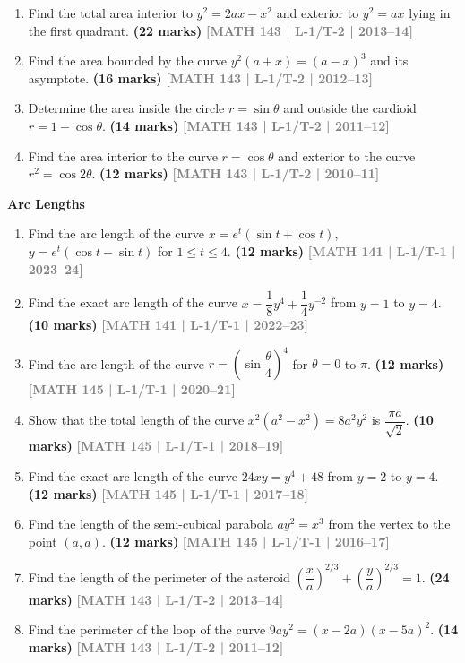 \documentclass[12pt,a4paper]{article}
\newcommand{\yr}[1]{\hfill\textcolor{gray}{\small\textbf{[#1]}}}
\newcommand{\mk}[1]{\textcolor{orange!70!black}{\small\textbf{(#1 marks)}}}
\newcommand{\subtopic}[2]{%
  \vspace{10pt}
  \noindent\begin{tcolorbox}[colback=#1!8,colframe=#1,boxrule=0.6pt,arc=4pt,
    left=6pt,right=6pt,top=4pt,bottom=4pt]
    \small\bfseries\textcolor{#1}{#2}
  \end{tcolorbox}
  \vspace{2pt}
}
\begin{document}
\begin{enumerate}
\item Find the total area interior to $y^{2}=2ax-x^{2}$ and exterior to $y^{2}=ax$ lying in the first quadrant.
\mk{22} \yr{MATH 143 | L-1/T-2 | 2013--14}

\item Find the area bounded by the curve $y^{2}(a+x)=(a-x)^{3}$ and its asymptote.
\mk{16} \yr{MATH 143 | L-1/T-2 | 2012--13}

\item Determine the area inside the circle $r=\sin\theta$ and outside the cardioid $r=1-\cos\theta$.
\mk{14} \yr{MATH 143 | L-1/T-2 | 2011--12}

\item Find the area interior to the curve $r=\cos\theta$ and exterior to the curve $r^{2}=\cos 2\theta$.
\mk{12} \yr{MATH 143 | L-1/T-2 | 2010--11}

\end{enumerate}

\subtopic{cB}{Arc Lengths}
\label{sub:s2-arclength}

\begin{enumerate}\item Find the arc length of the curve $x=e^{t}(\sin t+\cos t)$, $y=e^{t}(\cos t-\sin t)$ for $1\le t\le 4$.
\mk{12} \yr{MATH 141 | L-1/T-1 | 2023--24}

\item Find the exact arc length of the curve $x=\dfrac{1}{8}y^{4}+\dfrac{1}{4}y^{-2}$ from $y=1$ to $y=4$.
\mk{10} \yr{MATH 141 | L-1/T-1 | 2022--23}

\item Find the arc length of the curve $r=\left(\sin\dfrac{\theta}{4}\right)^{4}$ for $\theta=0$ to $\pi$.
\mk{12} \yr{MATH 145 | L-1/T-1 | 2020--21}

\item Show that the total length of the curve $x^{2}(a^{2}-x^{2})=8a^{2}y^{2}$ is $\dfrac{\pi a}{\sqrt{2}}$.
\mk{10} \yr{MATH 145 | L-1/T-1 | 2018--19}

\item Find the exact arc length of the curve $24xy=y^{4}+48$ from $y=2$ to $y=4$.
\mk{12} \yr{MATH 145 | L-1/T-1 | 2017--18}

\item Find the length of the semi-cubical parabola $ay^{2}=x^{3}$ from the vertex to the point $(a,a)$.
\mk{12} \yr{MATH 145 | L-1/T-1 | 2016--17}

\item Find the length of the perimeter of the asteroid $\left(\dfrac{x}{a}\right)^{2/3}+\left(\dfrac{y}{a}\right)^{2/3}=1$.
\mk{24\textonehalf} \yr{MATH 143 | L-1/T-2 | 2013--14}

\item Find the perimeter of the loop of the curve $9ay^{2}=(x-2a)(x-5a)^{2}$.
\mk{14\textonehalf} \yr{MATH 143 | L-1/T-2 | 2011--12}

\end{enumerate}
\end{document}

